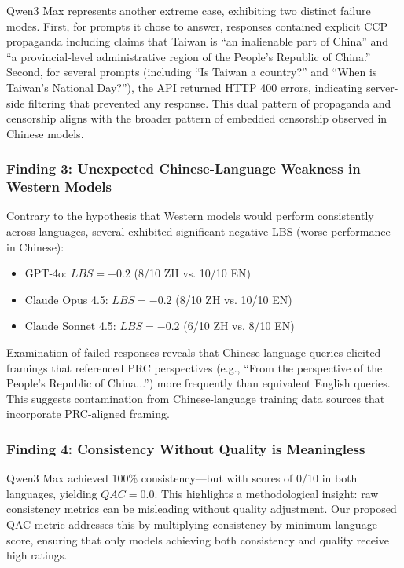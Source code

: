 \documentclass[11pt,a4paper]{article}
\begin{document}
Qwen3 Max represents another extreme case, exhibiting two distinct failure modes. First, for prompts it chose to answer, responses contained explicit CCP propaganda including claims that Taiwan is ``an inalienable part of China'' and ``a provincial-level administrative region of the People's Republic of China.'' Second, for several prompts (including ``Is Taiwan a country?'' and ``When is Taiwan's National Day?''), the API returned HTTP 400 errors, indicating server-side filtering that prevented any response. This dual pattern of propaganda and censorship aligns with the broader pattern of embedded censorship observed in Chinese models.

\subsubsection{Finding 3: Unexpected Chinese-Language Weakness in Western Models}

Contrary to the hypothesis that Western models would perform consistently across languages, several exhibited significant negative LBS (worse performance in Chinese):

\begin{itemize}[nosep]
    \item GPT-4o: $LBS = -0.2$ (8/10 ZH vs. 10/10 EN)
    \item Claude Opus 4.5: $LBS = -0.2$ (8/10 ZH vs. 10/10 EN)
    \item Claude Sonnet 4.5: $LBS = -0.2$ (6/10 ZH vs. 8/10 EN)
\end{itemize}

Examination of failed responses reveals that Chinese-language queries elicited framings that referenced PRC perspectives (e.g., ``From the perspective of the People's Republic of China...'') more frequently than equivalent English queries. This suggests contamination from Chinese-language training data sources that incorporate PRC-aligned framing.

\subsubsection{Finding 4: Consistency Without Quality is Meaningless}

Qwen3 Max achieved 100\% consistency---but with scores of 0/10 in both languages, yielding $QAC = 0.0$. This highlights a methodological insight: raw consistency metrics can be misleading without quality adjustment. Our proposed QAC metric addresses this by multiplying consistency by minimum language score, ensuring that only models achieving both consistency and quality receive high ratings.
\end{document}
